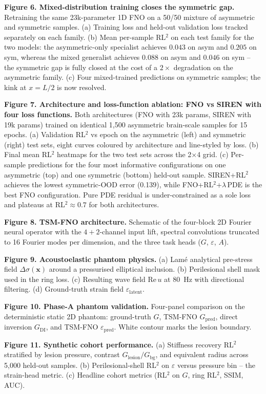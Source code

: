 \documentclass[11pt,letterpaper]{article}
\newcommand{\xvec}{\bm{x}}
\newcommand{\Gbg}{G_{\mathrm{bg}}}
\newcommand{\eps}{\varepsilon}
\newcommand{\Dsig}{\Delta\sigma}
\begin{document}
\textbf{Figure 6. Mixed-distribution training closes the symmetric gap.}
Retraining the same 23k-parameter 1D FNO on a 50/50 mixture of
asymmetric and symmetric samples. (a) Training loss and held-out
validation loss tracked separately on each family. (b) Mean per-sample
RL$^{2}$ on each test family for the two models: the asymmetric-only
specialist achieves $0.043$ on asym and $0.205$ on sym, whereas the
mixed generalist achieves $0.088$ on asym and $0.046$ on sym -- the
symmetric gap is fully closed at the cost of a $2\!\times$ degradation
on the asymmetric family. (c) Four mixed-trained predictions on
symmetric samples; the kink at $x=L/2$ is now resolved.

\textbf{Figure 7. Architecture and loss-function ablation: FNO vs SIREN
with four loss functions.}
Both architectures (FNO with 23k params, SIREN with 19k params) trained
on identical 1{,}500 asymmetric brain-scale samples for 15 epochs.
(a) Validation RL$^2$ vs epoch on the asymmetric (left) and symmetric
(right) test sets, eight curves coloured by architecture and
line-styled by loss. (b) Final mean RL$^2$ heatmaps for the two test
sets across the 2$\times$4 grid. (c) Per-sample predictions for the
four most informative configurations on one asymmetric (top) and one
symmetric (bottom) held-out sample. SIREN+RL$^2$ achieves the lowest
symmetric-OOD error (0.139), while FNO+RL$^2$+$\lambda$\,PDE is the best
FNO configuration. Pure PDE residual is under-constrained as a sole
loss and plateaus at RL$^2\!\approx\!0.7$ for both architectures.

\textbf{Figure 8. TSM-FNO architecture.}
Schematic of the four-block 2D Fourier neural operator with the
$4+2$-channel input lift, spectral convolutions truncated to 16 Fourier
modes per dimension, and the three task heads ($G$, $\eps$, $A$).

\textbf{Figure 9. Acoustoelastic phantom physics.}
(a) Lam\'e analytical pre-stress field $\Dsig(\xvec)$ around a pressurised
elliptical inclusion. (b) Perilesional shell mask used in the ring loss.
(c) Resulting wave field $\mathrm{Re}\,u$ at 80~Hz with directional
filtering. (d) Ground-truth strain field $\eps_{\mathrm{latent}}$.

\textbf{Figure 10. Phase-A phantom validation.}
Four-panel comparison on the deterministic static 2D phantom:
ground-truth $G$, TSM-FNO $G_{\mathrm{pred}}$, direct inversion $G_{\mathrm{DI}}$,
and TSM-FNO $\eps_{\mathrm{pred}}$. White contour marks the lesion boundary.

\textbf{Figure 11. Synthetic cohort performance.}
(a) Stiffness recovery RL$^{2}$ stratified by lesion pressure, contrast
$G_{\mathrm{lesion}}/\Gbg$, and equivalent radius across 5{,}000 held-out
samples. (b) Perilesional-shell RL$^{2}$ on $\eps$ versus pressure bin --
the strain-head metric. (c) Headline cohort metrics
(RL$^{2}$ on $G$, ring RL$^{2}$, SSIM, AUC).
\end{document}
